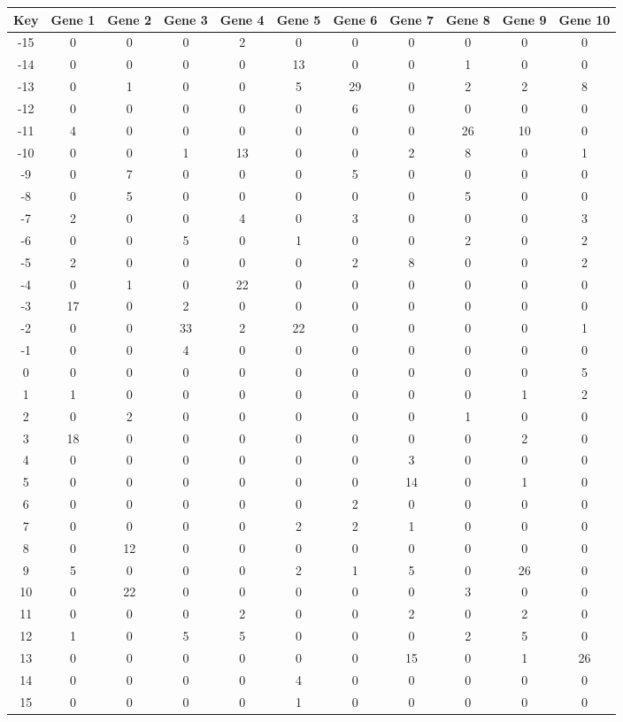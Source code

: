 \begin{tabular}{|c|c|c|c|c|c|c|c|c|c|c|}
\hline
Key & Gene 1 & Gene 2 & Gene 3 & Gene 4 & Gene 5 & Gene 6 & Gene 7 & Gene 8 & Gene 9 & Gene 10 \\
\hline
-15 & 0 & 0 & 0 & 2 & 0 & 0 & 0 & 0 & 0 & 0 \\
-14 & 0 & 0 & 0 & 0 & 13 & 0 & 0 & 1 & 0 & 0 \\
-13 & 0 & 1 & 0 & 0 & 5 & 29 & 0 & 2 & 2 & 8 \\
-12 & 0 & 0 & 0 & 0 & 0 & 6 & 0 & 0 & 0 & 0 \\
-11 & 4 & 0 & 0 & 0 & 0 & 0 & 0 & 26 & 10 & 0 \\
-10 & 0 & 0 & 1 & 13 & 0 & 0 & 2 & 8 & 0 & 1 \\
-9 & 0 & 7 & 0 & 0 & 0 & 5 & 0 & 0 & 0 & 0 \\
-8 & 0 & 5 & 0 & 0 & 0 & 0 & 0 & 5 & 0 & 0 \\
-7 & 2 & 0 & 0 & 4 & 0 & 3 & 0 & 0 & 0 & 3 \\
-6 & 0 & 0 & 5 & 0 & 1 & 0 & 0 & 2 & 0 & 2 \\
-5 & 2 & 0 & 0 & 0 & 0 & 2 & 8 & 0 & 0 & 2 \\
-4 & 0 & 1 & 0 & 22 & 0 & 0 & 0 & 0 & 0 & 0 \\
-3 & 17 & 0 & 2 & 0 & 0 & 0 & 0 & 0 & 0 & 0 \\
-2 & 0 & 0 & 33 & 2 & 22 & 0 & 0 & 0 & 0 & 1 \\
-1 & 0 & 0 & 4 & 0 & 0 & 0 & 0 & 0 & 0 & 0 \\
0 & 0 & 0 & 0 & 0 & 0 & 0 & 0 & 0 & 0 & 5 \\
1 & 1 & 0 & 0 & 0 & 0 & 0 & 0 & 0 & 1 & 2 \\
2 & 0 & 2 & 0 & 0 & 0 & 0 & 0 & 1 & 0 & 0 \\
3 & 18 & 0 & 0 & 0 & 0 & 0 & 0 & 0 & 2 & 0 \\
4 & 0 & 0 & 0 & 0 & 0 & 0 & 3 & 0 & 0 & 0 \\
5 & 0 & 0 & 0 & 0 & 0 & 0 & 14 & 0 & 1 & 0 \\
6 & 0 & 0 & 0 & 0 & 0 & 2 & 0 & 0 & 0 & 0 \\
7 & 0 & 0 & 0 & 0 & 2 & 2 & 1 & 0 & 0 & 0 \\
8 & 0 & 12 & 0 & 0 & 0 & 0 & 0 & 0 & 0 & 0 \\
9 & 5 & 0 & 0 & 0 & 2 & 1 & 5 & 0 & 26 & 0 \\
10 & 0 & 22 & 0 & 0 & 0 & 0 & 0 & 3 & 0 & 0 \\
11 & 0 & 0 & 0 & 2 & 0 & 0 & 2 & 0 & 2 & 0 \\
12 & 1 & 0 & 5 & 5 & 0 & 0 & 0 & 2 & 5 & 0 \\
13 & 0 & 0 & 0 & 0 & 0 & 0 & 15 & 0 & 1 & 26 \\
14 & 0 & 0 & 0 & 0 & 4 & 0 & 0 & 0 & 0 & 0 \\
15 & 0 & 0 & 0 & 0 & 1 & 0 & 0 & 0 & 0 & 0 \\
\hline
\end{tabular}